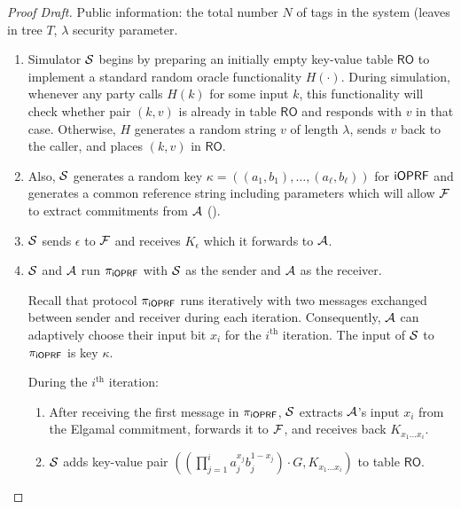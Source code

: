 \begin{proof}[Proof Draft]

Public information: the total number $N$ of tags in the system (leaves
in tree $T$, $\lambda$ security parameter.

  \begin{enumerate}

  \item Simulator ${\mathcal{S}}$ begins by preparing an initially empty
    key-value table $\mathsf{RO}$ to implement a standard random
    oracle functionality $H(\cdot)$. During simulation, whenever any
    party calls $H(k)$ for some input $k$, this functionality will
    check whether pair $(k,v)$ is already in table $\mathsf{RO}$ and
    responds with $v$ in that case. Otherwise, $H$ generates a random
    string $v$ of length $\lambda$, sends $v$ back to the caller, and
    places $(k,v)$ in $\mathsf{RO}$.

  \item Also, ${\mathcal{S}}$ generates a random key
    $\kappa=((a_1,b_1),\ldots,(a_\ell,b_\ell))$ for $\mathsf{i}\mathsf{OPRF}$ and generates
    a common reference string including parameters which will allow
    ${\mathcal{F}}$ to extract commitments from ${\mathcal{A}}$ ().

  \item ${\mathcal{S}}$ sends $\epsilon$ to ${\mathcal{F}}$ and receives $K_\epsilon$
    which it forwards to ${\mathcal{A}}$.
    
  \item ${\mathcal{S}}$ and ${\mathcal{A}}$ run ${\pi_{\mathsf{i}\mathsf{OPRF}}}$ with ${\mathcal{S}}$ as the sender and
    ${\mathcal{A}}$ as the receiver.

    Recall that protocol ${\pi_{\mathsf{i}\mathsf{OPRF}}}$ runs iteratively with two messages
    exchanged between sender and receiver during each
    iteration. Consequently, ${\mathcal{A}}$ can adaptively choose their input
    bit $x_i$ for the $i^\text{th}$ iteration. The input of ${\mathcal{S}}$ to
    ${\pi_{\mathsf{i}\mathsf{OPRF}}}$ is key $\kappa$.

    During the $i^\text{th}$ iteration:
    \begin{enumerate}
    \item After receiving the first message in ${\pi_{\mathsf{i}\mathsf{OPRF}}}$, ${\mathcal{S}}$
      extracts ${\mathcal{A}}$'s input $x_i$ from the Elgamal commitment,
      forwards it to ${\mathcal{F}}$, and receives back $K_{x_1\ldots{}x_i}$.

    \item ${\mathcal{S}}$ adds key-value pair
      $(( \prod_{j=1}^{i}
      a_j^{x_j}b_j^{1-x_j})\cdot{}G,K_{x_1\ldots{}x_i})$ to table
      $\mathsf{RO}$.
   
    \end{enumerate}
\end{enumerate}
\end{proof}
